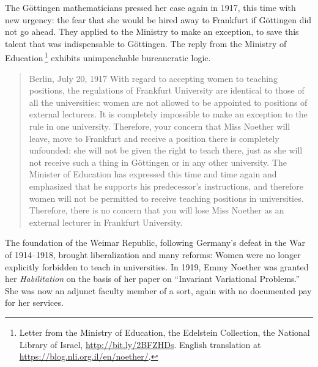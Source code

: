 \documentclass[twoside,symmetric]{tufte-handout}
\begin{document}
The G\"ottingen mathematicians pressed her case again in 1917, this time with new urgency: the fear that she would be hired away to Frankfurt if G\"ottingen did not go ahead. They applied to the Ministry to make an exception, to save this talent that was indispensable to G\"ottingen. The reply from the Ministry of Education$\,$\footnote{Letter from the Ministry of Education, the Edelstein Collection, the National Library of Israel, \url{http://bit.ly/2BFZHDs}. English translation at \url{https://blog.nli.org.il/en/noether/}.} exhibits unimpeachable bureaucratic logic.\vspace*{-6pt}
\begin{quotation}
\phantom{M}\hfill Berlin, July 20, 1917\phantom{MMM}\break
With regard to accepting women to teaching positions, the regulations of Frankfurt University are identical to those of all the universities: women are not allowed to be appointed to positions of external lecturers. It is completely impossible to make an exception to the rule in one university. Therefore, your concern that Miss Noether will leave, move to Frankfurt and receive a position there is completely unfounded: she will not be given the right to teach there, just as she will not receive such a thing in G\"ottingen or in any other university. The Minister of Education has expressed this time and time again and emphasized that he supports his predecessor's instructions, and therefore women will not be permitted to receive teaching positions in universities.\\[6pt]
\noindent Therefore, there is no concern that you will lose Miss Noether as an external lecturer in Frankfurt University.
\end{quotation}

The foundation of the Weimar Republic, following Germany's defeat in the War of 1914--1918, brought liberalization and many reforms: Women were no longer explicitly forbidden to teach in universities. In 1919, Emmy Noether was granted her \emph{Habilitation} on the basis of her paper on ``Invariant Variational Problems.'' She was now an adjunct faculty member of a sort, again with no documented pay for her services.

\end{document}
